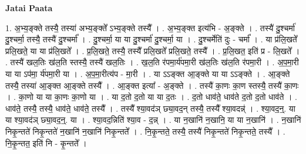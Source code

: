 \documentclass[17pt]{extarticle}
\begin{document}
\textbf{Jatai Paata} \newline

1. अ॒भ्य॒ङ्क्ते तस्यै॒ तस्या॑ अभ्य॒ङ्क्ते᳚ ऽभ्य॒ङ्क्ते तस्यै᳚ । . अ॒भ्य॒ङ्क्त इत्य॑भि - अ॒ङ्क्ते । . तस्यै॑ दु॒श्चर्मा॑ दु॒श्चर्मा॒ तस्यै॒ तस्यै॑ दु॒श्चर्मा᳚ । . दु॒श्चर्मा॒ या या दु॒श्चर्मा॑ दु॒श्चर्मा॒ या । . दु॒श्चर्मेति॑ दुः - चर्मा᳚ । . या प्र॑लि॒खते᳚ प्रलि॒खते॒ या या प्र॑लि॒खते᳚ । . प्र॒लि॒खते॒ तस्यै॒ तस्यै᳚ प्रलि॒खते᳚ प्रलि॒खते॒ तस्यै᳚ । . प्र॒लि॒खत॒ इति॑ प्र - लि॒खते᳚ । . तस्यै॑ खल॒तिः ख॑ल॒ति स्तस्यै॒ तस्यै॑ खल॒तिः । . ख॒ल॒ति र॑पमा॒र्य॑पमा॒री ख॑ल॒तिः ख॑ल॒ति र॑पमा॒री । . अ॒प॒मा॒री या या ऽप॑मा॒ र्य॑पमा॒री या । . अ॒प॒मा॒रीत्य॑प - मा॒री । . या ऽऽङ्क्त आ॒ङ्क्ते या या ऽऽङ्क्ते । . आ॒ङ्क्ते तस्यै॒ तस्या॑ आ॒ङ्क्त आ॒ङ्क्ते तस्यै᳚ । . आ॒ङ्क्त इत्या᳚ - अ॒ङ्क्ते । . तस्यै॑ का॒णः का॒ण स्तस्यै॒ तस्यै॑ का॒णः । . का॒णो या या का॒णः का॒णो या । . या द॒तो द॒तो या या द॒तः । . द॒तो धाव॑ते॒ धाव॑ते द॒तो द॒तो धाव॑ते । . धाव॑ते॒ तस्यै॒ तस्यै॒ धाव॑ते॒ धाव॑ते॒ तस्यै᳚ । . तस्यै᳚ श्या॒वद॑ञ् छ्या॒वद॒न् तस्यै॒ तस्यै᳚ श्या॒वदन्न्॑ । . श्या॒वद॒न्॒. या या श्या॒वद॑ञ् छ्या॒वद॒न्॒. या । . श्या॒वद॒न्निति॑ श्या॒व - द॒न्न् । . या न॒खानि॑ न॒खानि॒ या या न॒खानि॑ । . न॒खानि॑ निकृ॒न्तते॑ निकृ॒न्तते॑ न॒खानि॑ न॒खानि॑ निकृ॒न्तते᳚ । . नि॒कृ॒न्तते॒ तस्यै॒ तस्यै॑ निकृ॒न्तते॑ निकृ॒न्तते॒ तस्यै᳚ । . नि॒कृ॒न्तत॒ इति॑ नि - कृ॒न्तते᳚ । \newline
\end{document}
